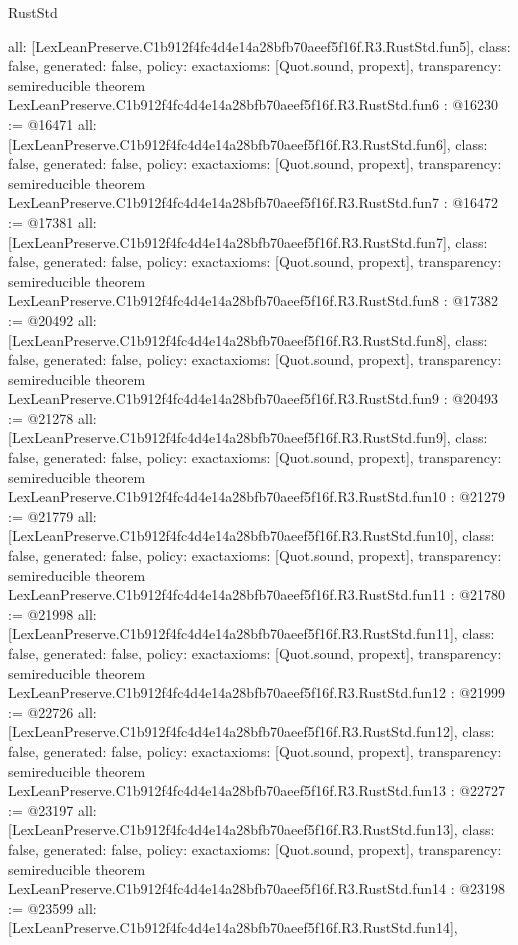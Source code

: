 \begin{lexlean}{RustStd}
\begin{coremodule}
{  all: [LexLeanPreserve.C1b912f4fc4d4e14a28bfb70aeef5f16f.R3.RustStd.fun5],
  class: false,
  generated: false,
  policy: exact{axioms: [Quot.sound, propext]},
  transparency: semireducible
}
theorem LexLeanPreserve.C1b912f4fc4d4e14a28bfb70aeef5f16f.R3.RustStd.fun6 : @16230 := @16471 {
  all: [LexLeanPreserve.C1b912f4fc4d4e14a28bfb70aeef5f16f.R3.RustStd.fun6],
  class: false,
  generated: false,
  policy: exact{axioms: [Quot.sound, propext]},
  transparency: semireducible
}
theorem LexLeanPreserve.C1b912f4fc4d4e14a28bfb70aeef5f16f.R3.RustStd.fun7 : @16472 := @17381 {
  all: [LexLeanPreserve.C1b912f4fc4d4e14a28bfb70aeef5f16f.R3.RustStd.fun7],
  class: false,
  generated: false,
  policy: exact{axioms: [Quot.sound, propext]},
  transparency: semireducible
}
theorem LexLeanPreserve.C1b912f4fc4d4e14a28bfb70aeef5f16f.R3.RustStd.fun8 : @17382 := @20492 {
  all: [LexLeanPreserve.C1b912f4fc4d4e14a28bfb70aeef5f16f.R3.RustStd.fun8],
  class: false,
  generated: false,
  policy: exact{axioms: [Quot.sound, propext]},
  transparency: semireducible
}
theorem LexLeanPreserve.C1b912f4fc4d4e14a28bfb70aeef5f16f.R3.RustStd.fun9 : @20493 := @21278 {
  all: [LexLeanPreserve.C1b912f4fc4d4e14a28bfb70aeef5f16f.R3.RustStd.fun9],
  class: false,
  generated: false,
  policy: exact{axioms: [Quot.sound, propext]},
  transparency: semireducible
}
theorem LexLeanPreserve.C1b912f4fc4d4e14a28bfb70aeef5f16f.R3.RustStd.fun10 : @21279 := @21779 {
  all: [LexLeanPreserve.C1b912f4fc4d4e14a28bfb70aeef5f16f.R3.RustStd.fun10],
  class: false,
  generated: false,
  policy: exact{axioms: [Quot.sound, propext]},
  transparency: semireducible
}
theorem LexLeanPreserve.C1b912f4fc4d4e14a28bfb70aeef5f16f.R3.RustStd.fun11 : @21780 := @21998 {
  all: [LexLeanPreserve.C1b912f4fc4d4e14a28bfb70aeef5f16f.R3.RustStd.fun11],
  class: false,
  generated: false,
  policy: exact{axioms: [Quot.sound, propext]},
  transparency: semireducible
}
theorem LexLeanPreserve.C1b912f4fc4d4e14a28bfb70aeef5f16f.R3.RustStd.fun12 : @21999 := @22726 {
  all: [LexLeanPreserve.C1b912f4fc4d4e14a28bfb70aeef5f16f.R3.RustStd.fun12],
  class: false,
  generated: false,
  policy: exact{axioms: [Quot.sound, propext]},
  transparency: semireducible
}
theorem LexLeanPreserve.C1b912f4fc4d4e14a28bfb70aeef5f16f.R3.RustStd.fun13 : @22727 := @23197 {
  all: [LexLeanPreserve.C1b912f4fc4d4e14a28bfb70aeef5f16f.R3.RustStd.fun13],
  class: false,
  generated: false,
  policy: exact{axioms: [Quot.sound, propext]},
  transparency: semireducible
}
theorem LexLeanPreserve.C1b912f4fc4d4e14a28bfb70aeef5f16f.R3.RustStd.fun14 : @23198 := @23599 {
  all: [LexLeanPreserve.C1b912f4fc4d4e14a28bfb70aeef5f16f.R3.RustStd.fun14],
}
\end{coremodule}
\end{lexlean}
